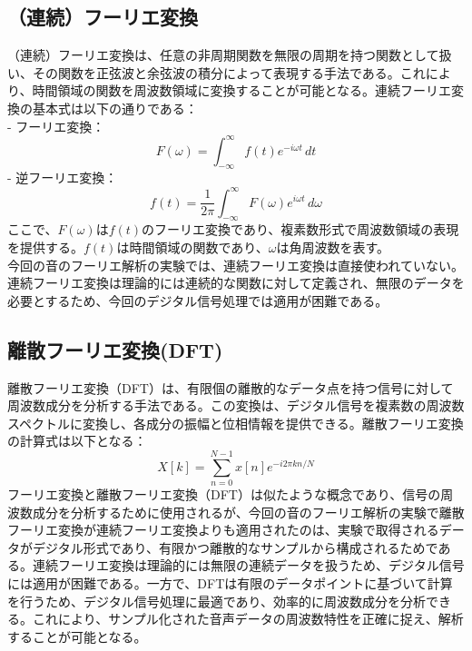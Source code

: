\documentclass{article}
\begin{document}
\subsection{（連続）フーリエ変換}
\begin{spacing}{1.2} %
    （連続）フーリエ変換は、任意の非周期関数を無限の周期を持つ関数として扱い、その関数を正弦波と余弦波の積分によって表現する手法である。これにより、時間領域の関数を周波数領域に変換することが可能となる。連続フーリエ変換の基本式は以下の通りである：\\
    - フーリエ変換：
    \[F(\omega) = \int_{-\infty}^{\infty} f(t) e^{-i \omega t} \, dt\]
    - 逆フーリエ変換：
    \[f(t) = \frac{1}{2\pi} \int_{-\infty}^{\infty} F(\omega) e^{i \omega t} \, d\omega\]
    \indent ここで、$F(\omega)$は$f(t)$のフーリエ変換であり、複素数形式で周波数領域の表現を提供する。$f(t)$は時間領域の関数であり、$\omega$は角周波数を表す。\\
    \indent 今回の音のフーリエ解析の実験では、連続フーリエ変換は直接使われていない。連続フーリエ変換は理論的には連続的な関数に対して定義され、無限のデータを必要とするため、今回のデジタル信号処理では適用が困難である。
\end{spacing}

\subsection{離散フーリエ変換(DFT)}
\begin{spacing}{1.2} %
    離散フーリエ変換（DFT）は、有限個の離散的なデータ点を持つ信号に対して周波数成分を分析する手法である。この変換は、デジタル信号を複素数の周波数スペクトルに変換し、各成分の振幅と位相情報を提供できる。離散フーリエ変換の計算式は以下となる：
    \[X[k] = \sum_{n=0}^{N-1} x[n] e^{-i 2\pi kn/N}\]
    \indent フーリエ変換と離散フーリエ変換（DFT）は似たような概念であり、信号の周波数成分を分析するために使用されるが、今回の音のフーリエ解析の実験で離散フーリエ変換が連続フーリエ変換よりも適用されたのは、実験で取得されるデータがデジタル形式であり、有限かつ離散的なサンプルから構成されるためである。連続フーリエ変換は理論的には無限の連続データを扱うため、デジタル信号には適用が困難である。一方で、DFTは有限のデータポイントに基づいて計算を行うため、デジタル信号処理に最適であり、効率的に周波数成分を分析できる。これにより、サンプル化された音声データの周波数特性を正確に捉え、解析することが可能となる。
\end{spacing}
\end{document}
